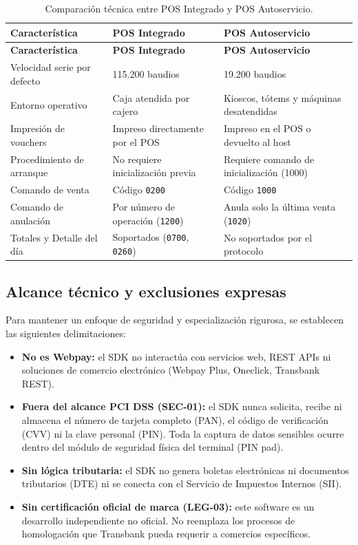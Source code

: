 \documentclass{../../plantilla/raysac-informe}
\begin{document}
\begin{longtable}{@{}p{3.2cm}p{5.5cm}p{5.5cm}@{}}
\caption{Comparación técnica entre POS Integrado y POS Autoservicio.}\label{tab:terminal-comparacion}\\
\toprule
\textbf{Característica} & \textbf{POS Integrado} & \textbf{POS Autoservicio} \\
\midrule
\endfirsthead
\toprule
\textbf{Característica} & \textbf{POS Integrado} & \textbf{POS Autoservicio} \\
\midrule
\endhead
\bottomrule
\endlastfoot
Velocidad serie por defecto & 115.200 baudios & 19.200 baudios \\
Entorno operativo & Caja atendida por cajero & Kioscos, tótems y máquinas desatendidas \\
Impresión de vouchers & Impreso directamente por el POS & Impreso en el POS o devuelto al host \\
Procedimiento de arranque & No requiere inicialización previa & Requiere comando de inicialización (1000) \\
Comando de venta & Código \texttt{0200} & Código \texttt{1000} \\
Comando de anulación & Por número de operación (\texttt{1200}) & Anula solo la última venta (\texttt{1020}) \\
Totales y Detalle del día & Soportados (\texttt{0700}, \texttt{0260}) & No soportados por el protocolo \\
\end{longtable}

\subsection{Alcance técnico y exclusiones expresas}
Para mantener un enfoque de seguridad y especialización rigurosa, se establecen las siguientes delimitaciones:
\begin{itemize}
  \item \textbf{No es Webpay:} el SDK no interactúa con servicios web, REST APIs ni soluciones de comercio
    electrónico (Webpay Plus, Oneclick, Transbank REST).
  \item \textbf{Fuera del alcance PCI DSS (SEC-01):} el SDK nunca solicita, recibe ni almacena el número de
    tarjeta completo (PAN), el código de verificación (CVV) ni la clave personal (PIN). Toda la captura de
    datos sensibles ocurre dentro del módulo de seguridad física del terminal (PIN pad).
  \item \textbf{Sin lógica tributaria:} el SDK no genera boletas electrónicas ni documentos tributarios (DTE)
    ni se conecta con el Servicio de Impuestos Internos (SII).
  \item \textbf{Sin certificación oficial de marca (LEG-03):} este software es un desarrollo independiente
    no oficial. No reemplaza los procesos de homologación que Transbank pueda requerir a comercios específicos.
\end{itemize}
\end{document}
